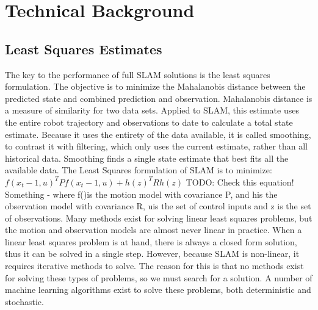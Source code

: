 \section{Technical Background}
\subsection{ Least Squares Estimates }

The key to the performance of full SLAM solutions is the least squares formulation.  The objective is to minimize the Mahalanobis distance between the predicted state and combined prediction and observation.  Mahalanobis distance is a measure of similarity for two data sets.  Applied to SLAM, this estimate uses the entire robot trajectory and observations to date to calculate a total state estimate.  Because it uses the entirety of the data available, it is called smoothing, to contrast it with filtering, which only uses the current estimate, rather than all historical data.  Smoothing finds a single state estimate that best fits all the available data.  
	The Least Squares formulation of SLAM is to minimize:
$f(x_t-1,u)^TPf(x_t-1,u) + h(z)^TRh(z) $   TODO: Check this equation! Something -
	where f()is the motion model with covariance P, and his the observation model with covariance R, uis the set of control inputs and z is the set of observations.
 Many methods exist for solving linear least squares problems, but the motion and observation models are almost never linear in practice.  When a linear least squares problem is at hand, there is always a closed form solution, thus it can be solved in a single step.  However, because SLAM is non-linear, it requires iterative methods to solve.  The reason for this is that no methods exist for solving these types of problems, so we must search for a solution.  A number of machine learning algorithms exist to solve these problems, both deterministic and stochastic.

